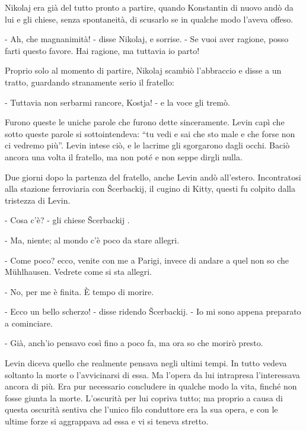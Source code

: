 Nikolaj era già del tutto pronto a partire, quando Konstantin di nuovo andò da lui e gli chiese, senza spontaneità, di scusarlo se in qualche modo l'aveva offeso. 

- Ah, che magnanimità! - disse Nikolaj, e sorrise. - Se vuoi aver ragione, posso farti questo favore. Hai ragione, ma tuttavia io parto! 

Proprio solo al momento di partire, Nikolaj scambiò l'abbraccio e disse a un tratto, guardando stranamente serio il fratello: 

- Tuttavia non serbarmi rancore, Kostja! - e la voce gli tremò. 

Furono queste le uniche parole che furono dette sinceramente. Levin capì che sotto queste parole si sottointendeva: ``tu vedi e sai che sto male e che forse non ci vedremo più''. Levin intese ciò, e le lacrime gli sgorgarono dagli occhi. Baciò ancora una volta il fratello, ma non poté e non seppe dirgli nulla. 

Due giorni dopo la partenza del fratello, anche Levin andò all'estero. Incontratosi alla stazione ferroviaria con Šcerbackij, il cugino di Kitty, questi fu colpito dalla tristezza di Levin. 

- Cosa c'è? - gli chiese Šcerbackij . 

- Ma, niente; al mondo c'è poco da stare allegri. 

- Come poco? ecco, venite con me a Parigi, invece di andare a quel non so che Mühlhausen. Vedrete come si sta allegri. 

- No, per me è finita. È tempo di morire. 

- Ecco un bello scherzo! - disse ridendo Šcerbackij. - Io mi sono appena preparato a cominciare. 

- Già, anch'io pensavo così fino a poco fa, ma ora so che morirò presto. 

Levin diceva quello che realmente pensava negli ultimi tempi. In tutto vedeva soltanto la morte o l'avvicinarsi di essa. Ma l'opera da lui intrapresa l'interessava ancora di più. Era pur necessario concludere in qualche modo la vita, finché non fosse giunta la morte. L'oscurità per lui copriva tutto; ma proprio a causa di questa oscurità sentiva che l'unico filo conduttore era la sua opera, e con le ultime forze si aggrappava ad essa e vi si teneva stretto. 